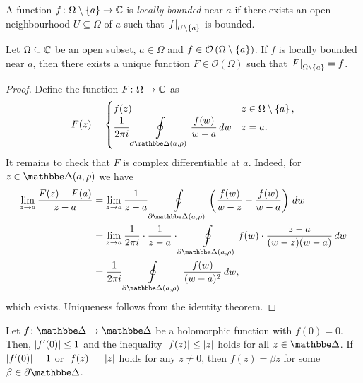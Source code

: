 
\begin{definicija}
A function $f \colon \Omega \setminus \left\{a\right\} \to \mathbb{C}$ is
\emph{locally bounded} near $a$ if there
exists an open neighbourhood $U \subseteq \Omega$ of $a$ such that
$\left. f\right|_{U \setminus \left\{a\right\}}^{}$ is bounded.
\end{definicija}

\begin{izrek}
Let $\Omega \subseteq \mathbb{C}$ be an open subset, $a \in \Omega$ and
$f \in \mathcal{O} \left(\Omega \setminus \left\{a\right\}\right)$. If $f$ is
locally bounded near $a$, then there exists a unique function
$F \in \mathcal{O}(\Omega)$ such that
$\left. F\right|_{\Omega \setminus \left\{a\right\}}^{} = f$.
\end{izrek}

\begin{proof}
Define the function $F \colon \Omega \to \mathbb{C}$ as
\[
F(z) = \begin{cases}
f(z) & z \in \Omega \setminus \set{a}, \\
\displaystyle
\frac{1}{2 \pi i} \olint_{\partial \dsk(a, \rho)}
\frac{f(w)}{w-a}\,dw & z = a.
\end{cases}
\]
It remains to check that $F$ is complex differentiable at $a$.
Indeed, for $z \in \dsk(a, \rho)$ we have
\begin{align*}
\lim_{z \to a} \frac{F(z) - F(a)}{z-a} &=
\lim_{z \to a} \frac{1}{z-a} \olint_{\partial \dsk(a, \rho)}
\br{\frac{f(w)}{w-z} - \frac{f(w)}{w-a}}\,dw
\\
&=
\lim_{z \to a} \frac{1}{2 \pi i} \cdot \frac{1}{z-a} \cdot
\olint_{\partial \dsk(a, \rho)}
f(w) \cdot \frac{z-a}{(w-z)(w-a)}\,dw
\\
&=
\frac{1}{2 \pi i}
\olint_{\partial \dsk(a, \rho)} \frac{f(w)}{(w-a)^2}\,dw,
\end{align*}
which exists. Uniqueness follows from the identity theorem.
\end{proof}

\begin{izrek}
Let $f \colon \dsk \to \dsk$ be a holomorphic function with
$f(0) = 0$. Then, $\left\lvert f'(0)\right\rvert \leq 1$ and the inequality
$\left\lvert f(z)\right\rvert \leq \left\lvert z\right\rvert$ holds for all $z \in \dsk$. If
$\left\lvert f'(0)\right\rvert = 1$ or $\left\lvert f(z)\right\rvert = \left\lvert z\right\rvert$ holds for any
$z \ne 0$, then $f(z) = \beta z$ for some
$\beta \in \partial \dsk$.
\end{izrek}

